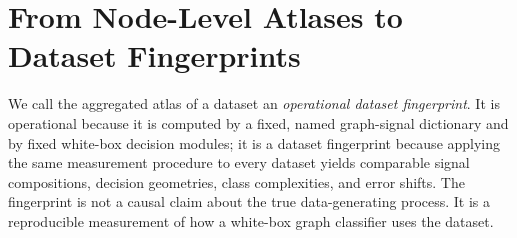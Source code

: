 \section{From Node-Level Atlases to Dataset Fingerprints}
\label{sec:mechanistic-atlas}

We call the aggregated atlas of a dataset an \emph{operational dataset
fingerprint}. It is operational because it is computed by a fixed, named
graph-signal dictionary and by fixed white-box decision modules; it is a
dataset fingerprint because applying the same measurement procedure to every
dataset yields comparable signal compositions, decision geometries, class
complexities, and error shifts. The fingerprint is not a causal claim about
the true data-generating process. It is a reproducible measurement of how a
white-box graph classifier uses the dataset.

